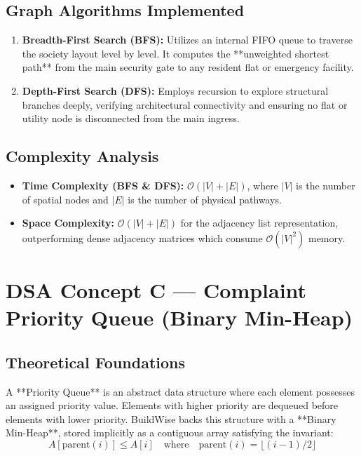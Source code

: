 \documentclass[12pt,a4paper]{article}
\begin{document}
\subsection{Graph Algorithms Implemented}
\begin{enumerate}[leftmargin=1.5em]
    \item \textbf{Breadth-First Search (BFS):} Utilizes an internal FIFO queue to traverse the society layout level by level. It computes the **unweighted shortest path** from the main security gate to any resident flat or emergency facility.
    \item \textbf{Depth-First Search (DFS):} Employs recursion to explore structural branches deeply, verifying architectural connectivity and ensuring no flat or utility node is disconnected from the main ingress.
\end{enumerate}

\subsection{Complexity Analysis}
\begin{itemize}[leftmargin=1.5em]
    \item \textbf{Time Complexity (BFS \& DFS):} $\mathcal{O}(|V| + |E|)$, where $|V|$ is the number of spatial nodes and $|E|$ is the number of physical pathways.
    \item \textbf{Space Complexity:} $\mathcal{O}(|V| + |E|)$ for the adjacency list representation, outperforming dense adjacency matrices which consume $\mathcal{O}(|V|^2)$ memory.
\end{itemize}

\section{DSA Concept C --- Complaint Priority Queue (Binary Min-Heap)}

\subsection{Theoretical Foundations}
A **Priority Queue** is an abstract data structure where each element possesses an assigned priority value. Elements with higher priority are dequeued before elements with lower priority. BuildWise backs this structure with a **Binary Min-Heap**, stored implicitly as a contiguous array satisfying the invariant:
\begin{equation}
    A[\text{parent}(i)] \le A[i] \quad \text{where} \quad \text{parent}(i) = \lfloor (i - 1) / 2 \rfloor
\end{equation}
\end{document}
